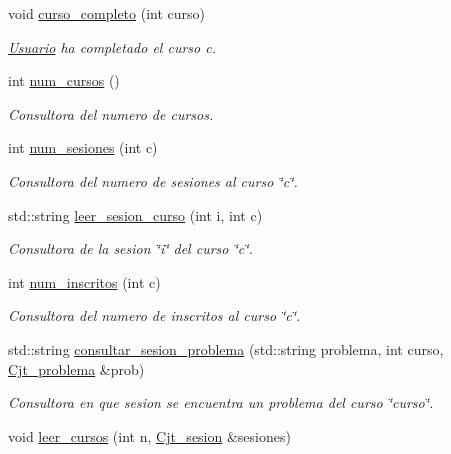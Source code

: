 \begin{DoxyCompactItemize}
void \mbox{\hyperlink{class_cjt__curso_a7e15ba1bdb4d1de93862a8c56dde53e5}{curso\+\_\+completo}} (int curso)
\begin{DoxyCompactList}\small\item\em \mbox{\hyperlink{class_usuario}{Usuario}} ha completado el curso c. \end{DoxyCompactList}\item 
int \mbox{\hyperlink{class_cjt__curso_a1ad84838189a13e86741d96cf2107d9c}{num\+\_\+cursos}} ()
\begin{DoxyCompactList}\small\item\em Consultora del numero de cursos. \end{DoxyCompactList}\item 
int \mbox{\hyperlink{class_cjt__curso_ad20fa025853fba4451e60e9b0cdb4011}{num\+\_\+sesiones}} (int c)
\begin{DoxyCompactList}\small\item\em Consultora del numero de sesiones al curso \char`\"{}c\char`\"{}. \end{DoxyCompactList}\item 
std\+::string \mbox{\hyperlink{class_cjt__curso_a62fcf92bed669fed99ef01f495570877}{leer\+\_\+sesion\+\_\+curso}} (int i, int c)
\begin{DoxyCompactList}\small\item\em Consultora de la sesion \char`\"{}i\char`\"{} del curso \char`\"{}c\char`\"{}. \end{DoxyCompactList}\item 
int \mbox{\hyperlink{class_cjt__curso_ac160a24d24ca6a57b7e8bf6925b10343}{num\+\_\+inscritos}} (int c)
\begin{DoxyCompactList}\small\item\em Consultora del numero de inscritos al curso \char`\"{}c\char`\"{}. \end{DoxyCompactList}\item 
std\+::string \mbox{\hyperlink{class_cjt__curso_a6d9976b271bd773bdff14e79991231e4}{consultar\+\_\+sesion\+\_\+problema}} (std\+::string problema, int curso, \mbox{\hyperlink{class_cjt__problema}{Cjt\+\_\+problema}} \&prob)
\begin{DoxyCompactList}\small\item\em Consultora en que sesion se encuentra un problema del curso \char`\"{}curso\char`\"{}. \end{DoxyCompactList}\item 
void \mbox{\hyperlink{class_cjt__curso_a16e2b8c5304b5cb0562f95089f020a97}{leer\+\_\+cursos}} (int n, \mbox{\hyperlink{class_cjt__sesion}{Cjt\+\_\+sesion}} \&sesiones)

\end{DoxyCompactItemize}
